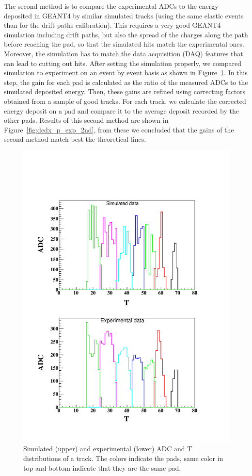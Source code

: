 \documentclass[twocolumn,showpacs,superscriptaddress,groupedaddress]{revtex4}
\begin{document}
The second method is to compare the experimental ADCs to the energy deposited in 
GEANT4 by similar simulated tracks (using the same elastic events than for the drift 
paths calibration). This requires a very good GEANT4 simulation 
including drift paths, but also the spread of the charges along the path
before reaching the pad, so that the simulated hits match the experimental 
ones. Moreover, the simulation has to match the data acquisition (DAQ) features 
that can lead to cutting out hits. After setting the simulation properly, we 
compared simulation to experiment on an event by event basis as shown in 
Figure~\ref{fig:EVENT_adc_tdc}. In this step, the gain for each pad is calculated 
as the ratio of the measured ADCs to the simulated deposited energy.  
Then, these gains are refined using correcting factors obtained from a 
sample of good tracks. For each track, we calculate the corrected 
energy deposit on a pad and compare it to the average
deposit recorded by the other pads. 
Results of this second method are shown in Figure~\ref{fig:dedx_p_exp_2nd},
from these we concluded that the gains of the 
second method match best the theoretical lines.

\begin{figure}[tb]
   \centering
\includegraphics[scale=0.42]{fig_2017/Event_ADC_Graph_8799283.pdf}
\caption{Simulated (upper) and experimental (lower) ADC and T distributions 
of a track. The colors indicate the pads, same color in top and bottom indicate 
that they are the same pad.}
\label{fig:EVENT_adc_tdc}
\end{figure}
\end{document}
